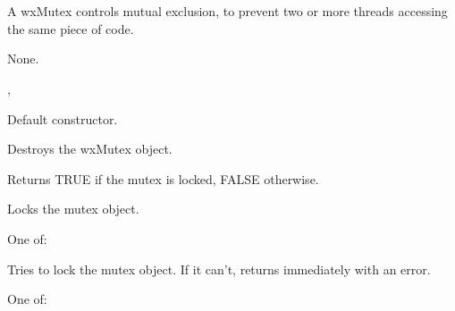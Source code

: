 \section{}\label{wxmutex}

A wxMutex controls mutual exclusion, to prevent two or more threads accessing
the same piece of code.


None.


, 


\label{wxmutexconstr}


Default constructor.



Destroys the wxMutex object.

\label{wxmutexislocked}


Returns TRUE if the mutex is locked, FALSE otherwise.

\label{wxmutexlock}


Locks the mutex object.


One of:

\twocolwidtha{7cm}
\begin{twocollist}\itemsep=0pt
\end{twocollist}

\label{wxmutextrylock}


Tries to lock the mutex object. If it can't, returns immediately with an error.


One of:

